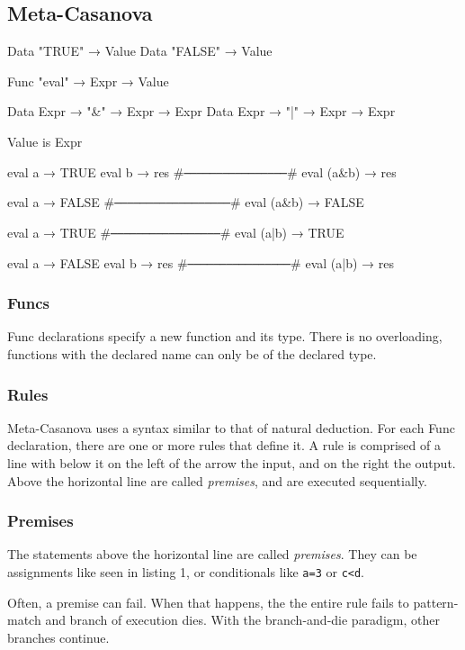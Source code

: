 \subsection{Meta-Casanova}
  \begin{code}[caption=A Boolean expression interpreter in Meta-Casanova.]
  Data "TRUE"  → Value
  Data "FALSE" → Value
  
  Func "eval" → Expr → Value
  
  Data Expr → "&" → Expr → Expr
  Data Expr → "|" → Expr → Expr

  Value is Expr
  
  eval a → TRUE
  eval b → res
  #\verb|────────────────|#
  eval (a&b) → res
  
  
  eval a → FALSE
  #\verb|──────────────────|#
  eval (a&b) → FALSE
  
  
  eval a → TRUE
  #\verb|─────────────────|#
  eval (a|b) → TRUE
  
  
  eval a → FALSE
  eval b → res
  #\verb|────────────────|#
  eval (a|b) → res
  \end{code}

  \subsubsection*{Funcs}
  Func declarations specify a new function and its type.
  There is no overloading, functions with the declared name can only be of the declared type.

  \subsubsection*{Rules}
  Meta-Casanova uses a syntax similar to that of natural deduction.
  For each Func declaration, there are one or more rules that define it.
  A rule is comprised of a line with below it on the left of the arrow the input, and on the right the output.
  Above the horizontal line are called \textit{premises}, and are executed sequentially.

  \subsubsection*{Premises}
  The statements above the horizontal line are called \textit{premises}.
  They can be assignments like seen in listing 1, or conditionals like \verb|a=3| or \verb|c<d|.

  Often, a premise can fail.
  When that happens, the the entire rule fails to pattern-match and branch of execution dies.
  With the branch-and-die paradigm, other branches continue.

